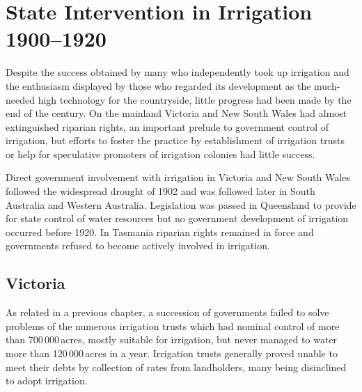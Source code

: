 
\chapter{State Intervention in Irrigation 1900--1920}

\label{ch:stateint}

\setcounter{endnote}{0}

Despite the success obtained by many who independently took up
irrigation and the enthusiasm displayed by those who regarded its
development as the much-needed high technology for the countryside,
little progress had been made by the end of the century.  On the
mainland Victoria and New South Wales had almost extinguished
riparian rights, an important prelude to
government control of irrigation, but efforts to foster the practice
by establishment of irrigation trusts or help for speculative
promoters of irrigation colonies had little success.

Direct government involvement with irrigation in Victoria and New
South Wales followed the widespread drought of 1902 and
was followed later in South Australia and Western Australia.
Legislation was passed in Queensland to provide for state control of
water resources but no government development of irrigation occurred
before 1920.  In Tasmania riparian rights remained in force and
governments refused to become actively involved in irrigation.

\section*{Victoria}

As related in a previous chapter, a succession of governments failed
to solve problems of the numerous irrigation trusts which had nominal
control of more than 700\,000\,acres, mostly suitable for irrigation, but
never managed to water more than 120\,000\,acres in a year.  Irrigation
trusts generally proved unable to meet their debts by collection of
rates from landholders, many being disinclined to adopt
irrigation.

